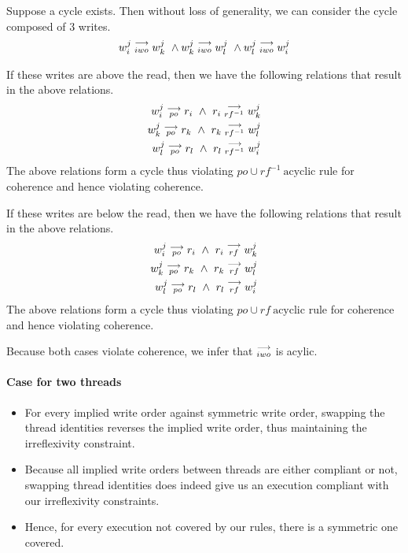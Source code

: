         Suppose a cycle exists. Then without loss of generality, we can consider the cycle composed of 3 writes.
        \begin{align}
            \reln{w_i^j}{iwo}{w_k^j} \ \wedge \reln{w_k^j}{iwo}{w_l^j} \ \wedge \reln{w_l^j}{iwo}{w_i^j}  
        \end{align}
        
        If these writes are above the read, then we have the following relations that result in the above relations.
        \begin{align}
            w_i^j\stackrel{\longrightarrow}{_{po}}r_i \ \wedge \ r_i\stackrel{\longrightarrow}{_{rf^{-1}}}w_k^j \\
            w_k^j\stackrel{\longrightarrow}{_{po}}r_k \ \wedge \ r_k\stackrel{\longrightarrow}{_{rf^{-1}}}w_l^j \\
            w_l^j\stackrel{\longrightarrow}{_{po}}r_l \ \wedge \ r_l\stackrel{\longrightarrow}{_{rf^{-1}}}w_i^j 
        \end{align}
        The above relations form a cycle thus violating $po \cup rf^{-1} \ \text{acyclic}$ rule for coherence and hence violating coherence.
        
        If these writes are below the read, then we have the following relations that result in the above relations.
        \begin{align}
            w_i^j\stackrel{\longrightarrow}{_{po}}r_i \ \wedge \ r_i\stackrel{\longrightarrow}{_{rf}}w_k^j \\
            w_k^j\stackrel{\longrightarrow}{_{po}}r_k \ \wedge \ r_k\stackrel{\longrightarrow}{_{rf}}w_l^j \\
            w_l^j\stackrel{\longrightarrow}{_{po}}r_l \ \wedge \ r_l\stackrel{\longrightarrow}{_{rf}}w_i^j 
        \end{align}
        The above relations form a cycle thus violating $po \cup rf \ \text{acyclic}$ rule for coherence and hence violating coherence.

        Because both cases violate coherence, we infer that $\stackrel{\longrightarrow}{_{iwo}}$ is acylic. 


    \paragraph{Case for two threads}

        \begin{itemize}
            \item For every implied write order against symmetric write order, swapping the thread identities reverses the implied write order, thus maintaining the irreflexivity constraint.
            \item Because all implied write orders between threads are either compliant or not, swapping thread identities does indeed give us an execution compliant with our irreflexivity constraints. 
            \item Hence, for every execution not covered by our rules, there is a symmetric one covered. 
        \end{itemize}

